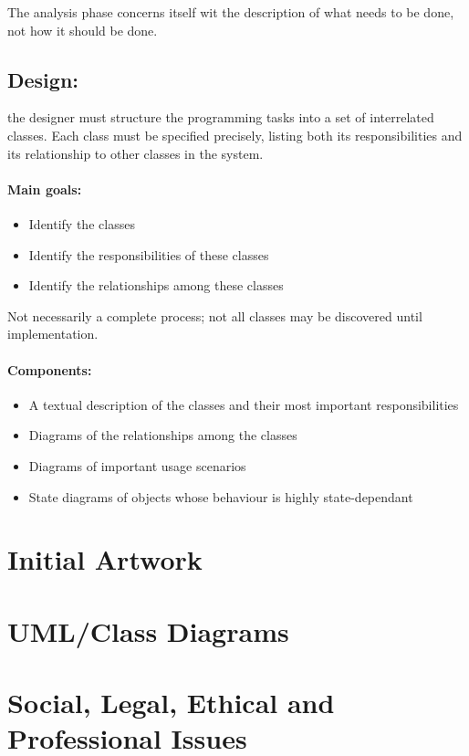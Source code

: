 \documentclass[a4paper,oneside]{report}
\begin{document}
The analysis phase concerns itself wit the description of what needs to be done, not how it should be done.

\section{Design:} the designer must structure the programming tasks into a set of interrelated classes. Each class must be specified precisely, listing both its responsibilities and its relationship to other classes in the system.

\subsubsection{Main goals:}
\begin{itemize}
\item Identify the classes
\item Identify the responsibilities of these classes
\item Identify the relationships among these classes
\end{itemize}

Not necessarily a complete process; not all classes may be discovered until implementation.

\subsubsection{Components:} 
\begin{itemize}
\item A textual description of the classes and their most important responsibilities
\item Diagrams of the relationships among the classes
\item Diagrams of important usage scenarios
\item State diagrams of objects whose behaviour is highly state-dependant
\end{itemize}

\chapter{Initial Artwork}
\chapter{UML/Class Diagrams}
	
\chapter{Social, Legal, Ethical and Professional Issues}
\end{document}
